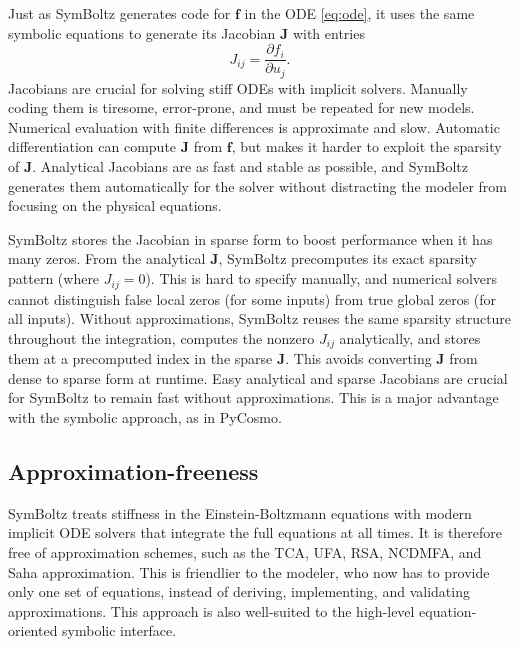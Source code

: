 \documentclass{aa}
\begin{document}
Just as SymBoltz generates code for $\boldsymbol{f}$ in the ODE \eqref{eq:ode}, it uses the same symbolic equations to generate its Jacobian $\boldsymbol{J}$ with entries
\begin{equation}
    J_{ij} = \frac{\partial f_i}{\partial u_j}.
\label{eq:jacobian}
\end{equation}
Jacobians are crucial for solving stiff ODEs with implicit solvers.
Manually coding them is tiresome, error-prone, and must be repeated for new models.
Numerical evaluation with finite differences is approximate and slow.
Automatic differentiation can compute $\boldsymbol{J}$ from $\boldsymbol{f}$, but makes it harder to exploit the sparsity of $\boldsymbol{J}$.
Analytical Jacobians are as fast and stable as possible,
and SymBoltz generates them automatically for the solver without distracting the modeler from focusing on the physical equations.

SymBoltz stores the Jacobian in sparse form to boost performance when it has many zeros.
From the analytical $\boldsymbol{J}$, SymBoltz precomputes its exact sparsity pattern (where $J_{ij} = 0$).
This is hard to specify manually, and numerical solvers cannot distinguish false local zeros (for some inputs) from true global zeros (for all inputs).
Without approximations, SymBoltz reuses the same sparsity structure throughout the integration, computes the nonzero $J_{ij}$ analytically, and stores them at a precomputed index in the sparse $\boldsymbol{J}$.
This avoids converting $\boldsymbol{J}$ from dense to sparse form at runtime.
Easy analytical and sparse Jacobians are crucial for SymBoltz to remain fast without approximations.
This is a major advantage with the symbolic approach, as in PyCosmo.

\subsection{Approximation-freeness}
\label{sec:approx-free}

SymBoltz treats stiffness in the Einstein-Boltzmann equations with modern implicit ODE solvers that integrate the full equations at all times.
It is therefore free of approximation schemes, such as the TCA, UFA, RSA, NCDMFA, and Saha approximation.
This is friendlier to the modeler, who now has to provide only one set of equations, instead of deriving, implementing, and validating approximations.
This approach is also well-suited to the high-level equation-oriented symbolic interface.
\end{document}
